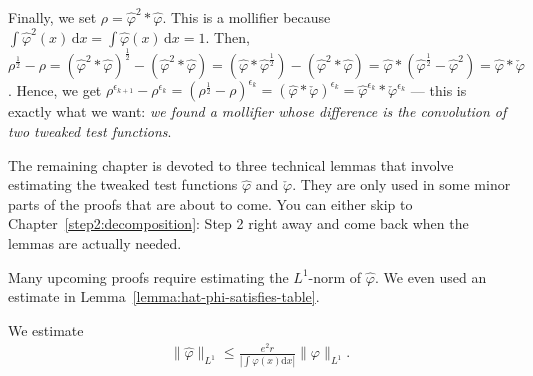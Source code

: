 Finally, we set \(\rho = \hat \varphi^2 * \hat \varphi\). This is a mollifier because \(\int \hat \varphi^2(x) \, \mathrm{d}x = \int \hat \varphi(x)  \, \mathrm{d}x = 1\).  Then, \(\rho^{\frac{1}{2}} - \rho = (\hat \varphi^2 * \hat \varphi)^{\frac{1}{2}} - (\hat \varphi^2 * \hat \varphi) = (\hat \varphi * \hat \varphi^{\frac{1}{2}})- (\hat \varphi^2 * \hat \varphi) = \hat \varphi * (\hat \varphi^{\frac{1}{2}} - \hat \varphi^{2}) = \hat \varphi * \check \varphi\). Hence, we get \(\rho^{\epsilon_{k+1}} - \rho^{\epsilon_k} = (\rho^{\frac{1}{2}} - \rho)^{\epsilon_k} = (\hat \varphi * \check \varphi)^{\epsilon_k} = \hat \varphi^{\epsilon_k} * \check \varphi^{\epsilon_k}\) --- this is exactly what we want: \emph{we found a mollifier whose difference is the convolution of two tweaked test functions}.

The remaining chapter is devoted to three technical lemmas that involve estimating the tweaked test functions \(\hat \varphi\) and \(\check \varphi\). They are only used in some minor parts of the proofs that are about to come. You can either skip to Chapter~\ref{step2:decomposition}: Step 2 right away and come back when the lemmas are actually needed.

Many upcoming proofs require estimating the \(L^1\)-norm of \(\hat \varphi\). We even used an estimate in Lemma~\ref{lemma:hat-phi-satisfies-table}.
\begin{lemma}\label{lemma:tweaked-l1-norm}
We estimate
\begin{align}\label{tweaked-l1-norm}
    \lVert \hat \varphi \rVert_{L^1} \leq \frac{e^2 r}{|\int \varphi(x) \mathrm{d}x |} \lVert \varphi \rVert_{L^1}.
\end{align}
\end{lemma}


